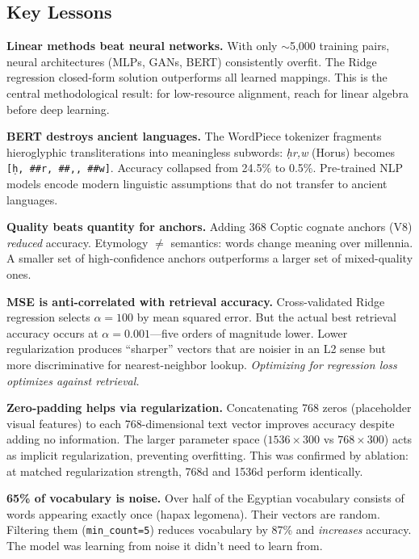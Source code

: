 \documentclass[11pt, a4paper]{article}
\begin{document}
\subsection{Key Lessons}

\textbf{Linear methods beat neural networks.} With only $\sim$5,000 training pairs, neural architectures (MLPs, GANs, BERT) consistently overfit. The Ridge regression closed-form solution outperforms all learned mappings. This is the central methodological result: for low-resource alignment, reach for linear algebra before deep learning.

\textbf{BERT destroys ancient languages.} The WordPiece tokenizer fragments hieroglyphic transliterations into meaningless subwords: \textit{\d{h}r,w} (Horus) becomes \texttt{[\d{h}, \#\#r, \#\#,, \#\#w]}. Accuracy collapsed from 24.5\% to 0.5\%. Pre-trained NLP models encode modern linguistic assumptions that do not transfer to ancient languages.

\textbf{Quality beats quantity for anchors.} Adding 368 Coptic cognate anchors (V8) \textit{reduced} accuracy. Etymology $\neq$ semantics: words change meaning over millennia. A smaller set of high-confidence anchors outperforms a larger set of mixed-quality ones.

\textbf{MSE is anti-correlated with retrieval accuracy.} Cross-validated Ridge regression selects $\alpha = 100$ by mean squared error. But the actual best retrieval accuracy occurs at $\alpha = 0.001$---five orders of magnitude lower. Lower regularization produces ``sharper'' vectors that are noisier in an L2 sense but more discriminative for nearest-neighbor lookup. \textit{Optimizing for regression loss optimizes against retrieval.}

\textbf{Zero-padding helps via regularization.} Concatenating 768 zeros (placeholder visual features) to each 768-dimensional text vector improves accuracy despite adding no information. The larger parameter space ($1536 \times 300$ vs $768 \times 300$) acts as implicit regularization, preventing overfitting. This was confirmed by ablation: at matched regularization strength, 768d and 1536d perform identically.

\textbf{65\% of vocabulary is noise.} Over half of the Egyptian vocabulary consists of words appearing exactly once (hapax legomena). Their vectors are random. Filtering them (\texttt{min\_count=5}) reduces vocabulary by 87\% and \textit{increases} accuracy. The model was learning from noise it didn't need to learn from.
\end{document}
